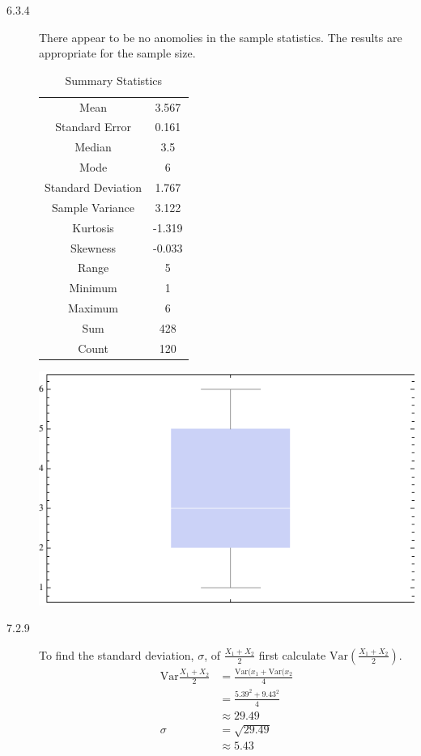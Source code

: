 \documentclass[letterpaper,10pt]{article}
\begin{document}
\begin{description}
\item[6.3.4]
There appear to be no anomolies in the sample statistics.  The results are appropriate for the sample size.
\begin{table}[htdp]
\caption{Summary Statistics}
\begin{center}
\begin{tabular}{|c|c|}\hline
Mean & 3.567 \\
Standard Error & 0.161 \\
Median & 3.5 \\
Mode & 6 \\
Standard Deviation & 1.767 \\
Sample Variance & 3.122 \\
Kurtosis & -1.319 \\
Skewness & -0.033 \\
Range & 5 \\
Minimum & 1 \\
Maximum & 6 \\
Sum & 428 \\
Count & 120 \\
\hline
\end{tabular}
\end{center}
\label{default}
\end{table}

\begin{center}
\includegraphics[scale=0.75]{module5a.pdf}
\end{center}


\item[7.2.9] %
To find the standard deviation, $\sigma$, of $\frac{X_{1}+X_{2}}{2}$ first calculate $\mbox{Var}(\frac{X_{1}+X_{2}}{2})$.
\begin{align*}
\mbox{Var}\frac{X_{1}+X_{2}}{2} &= \frac{\mbox{Var}(x_{1}+\mbox{Var}(x_{2}}{4} \\
&= \frac{5.39^{2}+9.43^2}{4} \\
&\approx 29.49 \\
\sigma &= \sqrt{29.49} \\
&\approx 5.43
\end{align*}


\end{description}
\end{document}
